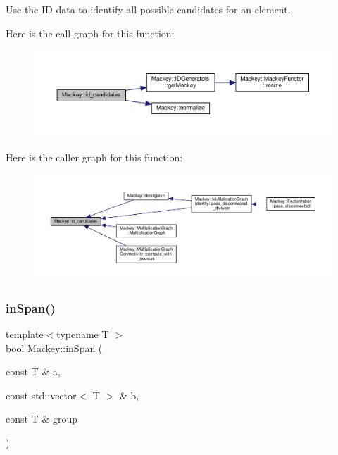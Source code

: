 Use the ID data to identify all possible candidates for an element. 

Here is the call graph for this function\+:\nopagebreak
\begin{figure}[H]
\begin{center}
\leavevmode
\includegraphics[width=350pt]{namespaceMackey_a83ac78e6d1695af40d0fa58af5255e84_cgraph}
\end{center}
\end{figure}
Here is the caller graph for this function\+:\nopagebreak
\begin{figure}[H]
\begin{center}
\leavevmode
\includegraphics[width=350pt]{namespaceMackey_a83ac78e6d1695af40d0fa58af5255e84_icgraph}
\end{center}
\end{figure}
\mbox{\label{namespaceMackey_a1ff253bf7e043ad6455b5fea23a83f09}} 
\subsubsection{\texorpdfstring{in\+Span()}{inSpan()}}
{\footnotesize\ttfamily template$<$typename T $>$ \\
bool Mackey\+::in\+Span (\begin{DoxyParamCaption}\item[{const T \&}]{a,  }\item[{const std\+::vector$<$ T $>$ \&}]{b,  }\item[{const T \&}]{group }\end{DoxyParamCaption})}



